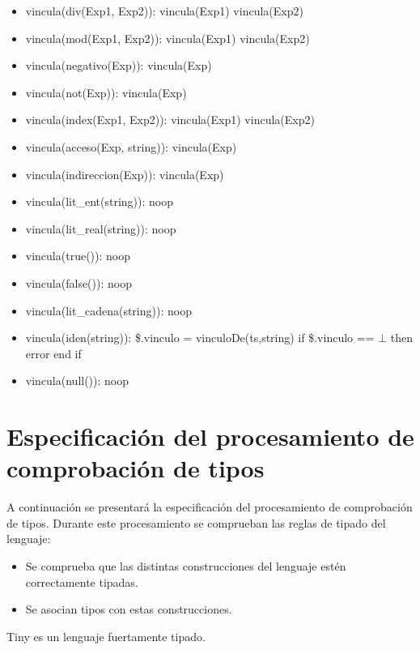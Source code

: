 \documentclass[11pt]{article}
\begin{document}
\begin{itemize}
                \item vincula(div(Exp1, Exp2)): 
                    \subitem vincula(Exp1) 
                    \subitem vincula(Exp2)
                \item vincula(mod(Exp1, Exp2)): 
                    \subitem vincula(Exp1) 
                    \subitem vincula(Exp2)
                \item vincula(negativo(Exp)): 
                    \subitem vincula(Exp)
                \item vincula(not(Exp)): 
                    \subitem vincula(Exp)
                \item vincula(index(Exp1, Exp2)): 
                    \subitem vincula(Exp1) 
                    \subitem vincula(Exp2)
                \item vincula(acceso(Exp, string)): 
                    \subitem vincula(Exp)
                \item vincula(indireccion(Exp)): 
                    \subitem vincula(Exp)
                \item vincula(lit\_ent(string)): 
                    \subitem noop
                \item vincula(lit\_real(string)): 
                    \subitem noop
                \item vincula(true()): 
                    \subitem noop
                \item vincula(false()): 
                    \subitem noop
                \item vincula(lit\_cadena(string)): 
                    \subitem noop
                \item vincula(iden(string)): 
                    \subitem \$.vinculo = vinculoDe(ts,string) 
                    \subitem if \$.vinculo == $\bot$ then 
                        \subsubitem error 
                    \subitem end if
                \item vincula(null()): 
                    \subitem noop
            \end{itemize}

    
    \section{Especificación del procesamiento de comprobación de tipos}
        A continuación se presentará la especificación del procesamiento de comprobación de tipos. Durante este procesamiento se comprueban las reglas de tipado del lenguaje:
        \begin{itemize}
            \item Se comprueba que las distintas construcciones del lenguaje estén
            correctamente tipadas.
            \item Se asocian tipos con estas construcciones.
        \end{itemize}
        Tiny es un lenguaje fuertamente tipado. 
        
\end{document}
